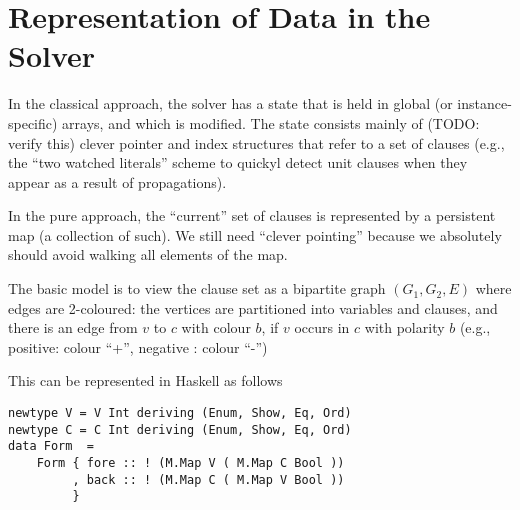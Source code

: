 \section{Representation of Data in the Solver}

In the classical approach, the solver has a state that is held 
in global (or instance-specific) arrays, and which is modified.
The state consists mainly of (TODO: verify this)
clever pointer and index structures that refer to a set of clauses
(e.g., the ``two watched literals'' scheme to quickyl detect unit clauses
when they appear as a result of propagations).

In the pure approach, the ``current'' set of clauses is represented
by a persistent map (a collection of such). We still need ``clever pointing'' 
because we absolutely should avoid walking all elements of the map.

The basic model is to view the clause set as a bipartite graph
$(G_1,G_2,E)$ where edges are 2-coloured:
the vertices are partitioned into variables and clauses,
and there is an edge from $v$ to $c$ with colour $b$,
if $v$ occurs in $c$ with polarity $b$ 
(e.g., positive: colour ``+'', negative : colour ``-'')

This can be represented in Haskell as follows
\begin{verbatim}
newtype V = V Int deriving (Enum, Show, Eq, Ord)
newtype C = C Int deriving (Enum, Show, Eq, Ord)
data Form  =
    Form { fore :: ! (M.Map V ( M.Map C Bool ))
         , back :: ! (M.Map C ( M.Map V Bool ))
         }
\end{verbatim}

